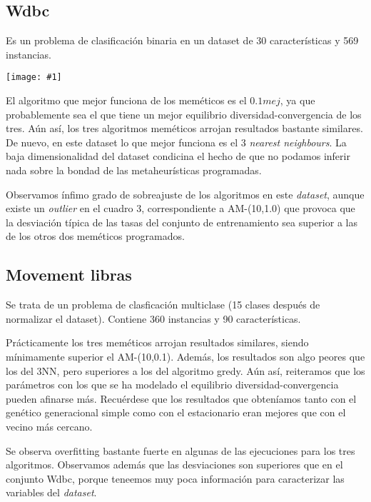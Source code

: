 \documentclass[a4paper,11pt]{article}
\newcommand{\imagen}[4]{
  \begin{minipage}{\linewidth}
    \centering
    \texttt{[image: \#1]}
    \captionof{figure}{#2}
    \label{#3}
  \end{minipage} 
}
\newcommand{\imgn}[3]{
  \begin{minipage}{\linewidth}
    \centering
    \texttt{[image: \#1]}
    \captionof{figure}{#2}
  \end{minipage} 
}
\begin{document}
  \subsection{Wdbc}
  
  Es un problema de clasificación binaria en un dataset de 30 características y 569 instancias.
  
  \imagen{../data/memetic/wdbc.png}{Tasas de clasificación en Wdbc}{wdbcgraph}{0.7}
  
  
  El algoritmo que mejor funciona de los meméticos es el $0.1mej$, ya que probablemente sea el que tiene un mejor equilibrio
  diversidad-convergencia de los tres. Aún así, los tres algoritmos meméticos arrojan resultados bastante similares. De nuevo,
  en este dataset lo que mejor funciona es el 3 \textit{nearest neighbours}. La baja dimensionalidad del dataset condicina el
  hecho de que no podamos inferir nada sobre la bondad de las metaheurísticas programadas.
  
  Observamos ínfimo grado de sobreajuste de los algoritmos en este \textit{dataset}, aunque existe un \textit{outlier} en el cuadro
  3, correspondiente a AM-(10,1.0) que provoca que la desviación típica de las tasas del conjunto de entrenamiento sea superior a 
  las de los otros dos meméticos programados.
  
 
  \subsection{Movement libras}
  
  Se trata de un problema de clasficación multiclase (15 clases después de normalizar el dataset). 
  Contiene 360 instancias y 90 características.
  
  Prácticamente los tres meméticos arrojan resultados similares, siendo mínimamente superior el AM-(10,0.1). Además, los resultados
  son algo peores que los del 3NN, pero superiores a los del algoritmo gredy. Aún así, reiteramos que los parámetros con los
  que se ha modelado el equilibrio diversidad-convergencia pueden afinarse más. Recuérdese que los resultados que obteníamos
  tanto con el genético generacional simple como con el estacionario eran mejores que con el vecino más cercano.
  
  Se observa overfitting bastante fuerte en algunas de las ejecuciones para los tres algoritmos. Observamos además que las
  desviaciones son superiores que en el conjunto Wdbc, porque teneemos muy poca información para caracterizar las variables
  del \textit{dataset}.
  
\end{document}
